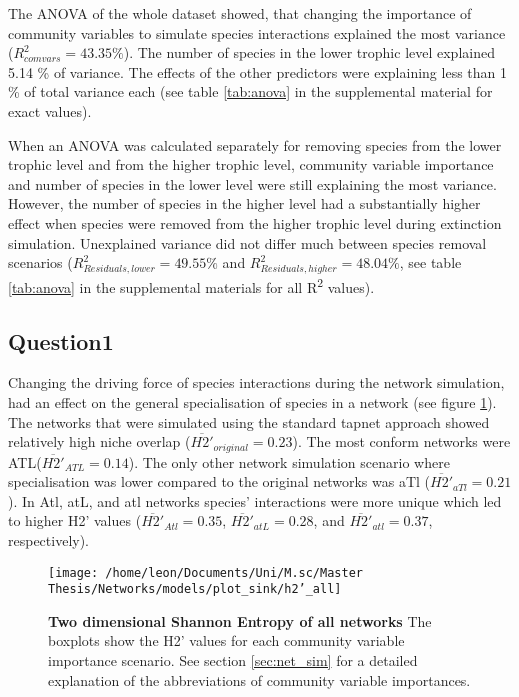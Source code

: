 \documentclass[12pt,a4paper]{article}
\begin{document}
The ANOVA of the whole dataset showed, that changing the importance of community variables to simulate species interactions explained the most variance ($ R^2_{com vars} = 43.35 \% $). The number of species in the lower trophic level explained 5.14 \% of variance. The effects of the other predictors were explaining less than 1 \% of total variance each (see table \ref{tab:anova} in the supplemental material for exact values).

When an ANOVA was calculated separately for removing species from the lower trophic level and from the higher trophic level, community variable importance and number of species in the lower level were still explaining the most variance. However, the number of species in the higher level had a substantially higher effect when species were removed from the higher trophic level during extinction simulation. Unexplained variance did not differ much between species removal scenarios ($ R^2_{Residuals, lower} = 49.55 \% $ and $ R^2_{Residuals, higher} = 48.04 \% $, see table \ref{tab:anova} in the supplemental materials for all R\textsuperscript{2} values). 


%

\subsection{Question1}

Changing the driving force of species interactions during the network simulation, had an effect on the general specialisation of species in a network (see figure \ref{fig:h2}). The networks that were simulated using the standard tapnet approach showed relatively high niche overlap ($ \overline{H2'}_{original} = 0.23 $). The most conform networks were ATL($ \overline{H2'}_{ATL} = 0.14 $). The only other network simulation scenario where specialisation was lower compared to the original networks was aTl ($ \overline{H2'}_{aTl} = 0.21 $). In Atl, atL, and atl networks species' interactions were more unique which led to higher H2' values ($ \overline{H2'}_{Atl} = 0.35 $, $ \overline{H2'}_{atL} = 0.28 $, and $ \overline{H2'}_{atl} = 0.37 $, respectively).
\begin{figure}[h]
	 \texttt{[image: /home/leon/Documents/Uni/M.sc/Master Thesis/Networks/models/plot\_sink/h2'\_all]}
	 \caption{\textbf{Two dimensional Shannon Entropy of all networks} The boxplots show the H2' values for each community variable importance scenario. See section \ref{sec:net_sim} for a detailed explanation of the abbreviations of community variable importances.}
	 \label{fig:h2}
\end{figure}
\end{document}
